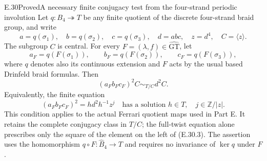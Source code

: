 \begin{statement}{E.30}{Proved}{A necessary finite conjugacy test from the four-strand periodic involution}
Let $q:B_4\twoheadrightarrow T$ be any finite quotient of the
discrete four-strand braid group, and write
\[
 a=q(\sigma_1),\quad b=q(\sigma_2),\quad c=q(\sigma_3),
 \quad d=abc,\quad z=d^4,\quad C=\langle z\rangle.
 \tag{E.30.1}
\]
The subgroup $C$ is central.  For every
$F=(\lambda,f)\in\widehat{\mathrm{GT}}$, let
\[
 a_F=q(F(\sigma_1)),\qquad
 b_F=q(F(\sigma_2)),\qquad
 c_F=q(F(\sigma_3)),
 \tag{E.30.2}
\]
where $q$ denotes also its continuous extension and $F$ acts by
the usual based Drinfeld braid formulas.  Then
\[
       (a_Fb_Fc_F)^2C\sim_{T/C}d^2C.
 \tag{E.30.3}
\]
Equivalently, the finite equation
\[
       (a_Fb_Fc_F)^2=h d^2h^{-1}z^j
       \quad\text{has a solution }h\in T,\quad
                       j\in\mathbb Z/|z|.
 \tag{E.30.4}
\]
This condition applies to the actual Ferrari quotient maps used
in Part E.  It retains the complete conjugacy class in $T/C$;
the full-twist equation alone prescribes only the square of the
element on the left of \textup{(E.30.3)}.  The assertion uses
the homomorphism $q\circ F:\widehat B_4\to T$ and requires no
invariance of $\ker q$ under $F$.
\end{statement}
